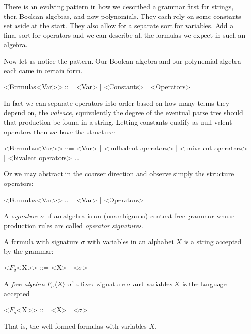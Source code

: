 There is an evolving pattern in how we described a grammar first for strings, 
then Boolean algebras, and now polynomials.  They each rely on some 
constants set aside at the start.  They also allow for a separate sort for
variables.  Add a final sort for operators and we can describe all the formulas 
we expect in such an algebra.

Now let us notice the pattern.  Our Boolean algebra and our polynomial algebra each 
came in certain form.
\begin{Gcode}[]
    <Formulas<Var>> ::= <Var>
            | <Constants>
            | <Operators>
\end{Gcode}
In fact we can separate operators into order based on how many terms they depend on,
the \emph{valence}, equivalently the degree of the eventual parse tree should that 
production be found in a string.  Letting constants qualify as null-valent operators 
then we have the structure:
\begin{Gcode}[]
    <Formulas<Var>> ::= <Var>
            | <nullvalent operators>
            | <univalent operators>
            | <bivalent operators>
            ...
\end{Gcode}
Or we may abstract in the coarser direction and observe simply the structure operators:
\begin{Gcode}[]
    <Formulas<Var>> ::= <Var>
                      | <Operators>
\end{Gcode}

\begin{definition}
    A \emph{signature} $\sigma$ of an algebra is an (unambiguous) context-free grammar 
    whose production rules are called \emph{operator signatures}.

    A formula with signature $\sigma$ with variables in an alphabet $X$
    is a string accepted by the grammar:
    \begin{Gcode}[]
        <$F_{\sigma}$<X>> ::= <X> | <$\sigma$>
    \end{Gcode}
\end{definition}


\begin{definition}
    A \emph{free algebra} $F_{\sigma}\langle X\rangle$ 
    of a fixed signature $\sigma$ and variables $X$
    is the language accepted 
    \begin{Gcode}[]
        <$F_{\sigma}$<X>> ::= <X> | <$\sigma$>
    \end{Gcode}
    That is, the well-formed formulas with variables $X$.
\end{definition}